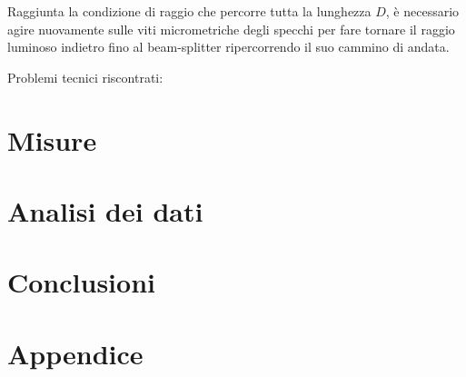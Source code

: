\documentclass{article}
\begin{document}
\vspace{3mm}

Raggiunta la condizione di raggio che percorre tutta la lunghezza $D$, è necessario agire nuovamente sulle viti micrometriche degli specchi per fare tornare il raggio
luminoso indietro fino al beam-splitter ripercorrendo il suo cammino di andata.

\vspace{3mm}

Problemi tecnici riscontrati: 

\section{Misure}

\section{Analisi dei dati}

\section{Conclusioni}

\section{Appendice}
\end{document}
